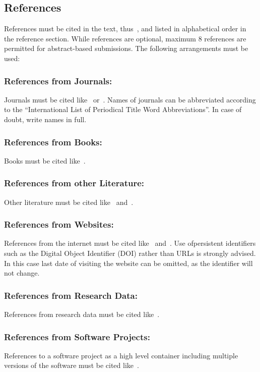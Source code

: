 \documentclass{isprs} %
\begin{document}
\subsection{References}\label{sec:References}
References must be cited in the text, thus~\cite{smith1987rep}, and listed in alphabetical order in the reference section. While references are optional, maximum 8 references are permitted for abstract-based submissions. The following arrangements must be used:

\subsubsection{References from Journals:} 
Journals must be cited like~\cite{smith1987} or~\cite{michalis2008}. Names of journals can be abbreviated according to the ``International List of Periodical Title Word Abbreviations''. In case of doubt, write names in full.

\subsubsection{References from Books:} 
Books must be cited like~\cite{foerstner2016}.

\subsubsection{References from other Literature:}
Other literature must be cited like~\cite{smith1987rep} and~\cite{smith2000}.

\subsubsection{References from Websites:}
References from the internet must be cited like~\cite{chan2017} and~\cite{maas2017}. Use ofpersistent identifiers such as the Digital Object Identifier (DOI) rather than URLs is strongly advised. In this case last date of visiting the website can be omitted, as the identifier will not change.

\subsubsection{References from Research Data:}
References from research data must be cited like~\cite{dubayah2013}.

\subsubsection{References from Software Projects:}
References to a software project as a high level container including multiple versions of the software must be cited like~\cite{grass2017}.
\end{document}

